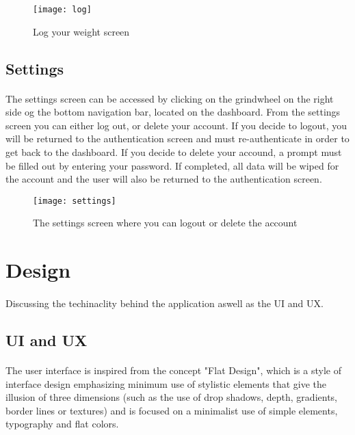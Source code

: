 \documentclass{article}
\begin{document}
    \hfill \break
    \hfill \break
            
    \begin{figure}[h!]
        \texttt{[image: log]}
        \centering
        \caption{Log your weight screen}
    \end{figure}
    \newpage

\subsection{Settings}
\paragraph{}
    The settings screen can be accessed by clicking on the grindwheel on the right side og the bottom navigation bar, located on the dashboard.
    From the settings screen you can either log out, or delete your account. If you decide to logout, you will be returned to the authentication screen
    and must re-authenticate in order to get back to the dashboard. If you decide to delete your accound, a prompt must be filled out by entering your password.
    If completed, all data will be wiped for the account and the user will also be returned to the authentication screen.
  
    \hfill \break
    \hfill \break
                
    \begin{figure}[h!]
        \texttt{[image: settings]}
        \centering
        \caption{The settings screen where you can logout or delete the account}
    \end{figure}

\newpage

\section{Design}
\paragraph{}
    Discussing the techinaclity behind the application aswell as the UI and UX.

    \hfill \break
    \hfill \break

\subsection{UI and UX}
\paragraph{}
    The user interface is inspired from the concept "Flat Design", which is a style of interface design emphasizing minimum use of stylistic elements 
    that give the illusion of three dimensions (such as the use of drop shadows, depth, gradients, border lines or textures) and is focused on a minimalist
    use of simple elements, typography and flat colors.
\end{document}
